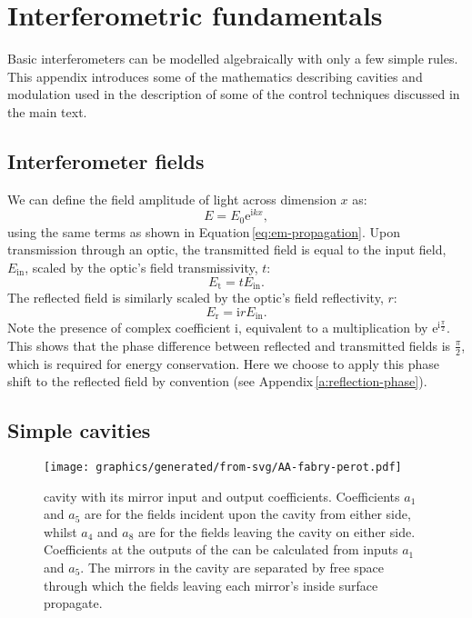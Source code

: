 \chapter{\label{a:interferometry}Interferometric fundamentals}
Basic interferometers can be modelled algebraically with only a few simple rules. This appendix introduces some of the mathematics describing \FP{} cavities and modulation used in the description of some of the control techniques discussed in the main text.

\section{Interferometer fields}
We can define the field amplitude of light across dimension $x$ as:
\begin{equation}
  \label{eq:field-amplitude}
  E = E_0 \text{e}^{\text{i} kx},
\end{equation}
using the same terms as shown in Equation\,\ref{eq:em-propagation}. Upon transmission through an optic, the transmitted field is equal to the input field, $E_{\text{in}}$, scaled by the optic's field transmissivity, $t$:
\begin{equation}
  \label{eq:transmitted-field}
  E_{\text{t}} = tE_{\text{in}}.
\end{equation}
The reflected field is similarly scaled by the optic's field reflectivity, $r$:
\begin{equation}
  \label{eq:reflected-field}
  E_{\text{r}} = \text{i}rE_{\text{in}}.
\end{equation}
Note the presence of complex coefficient $\text{i}$, equivalent to a multiplication by $\text{e}^{\text{i} \frac{\pi}{2}}$. This shows that the phase difference between reflected and transmitted fields is $\frac{\pi}{2}$, which is required for energy conservation. Here we choose to apply this phase shift to the reflected field by convention (see Appendix\,\ref{a:reflection-phase}).

\section{\label{sec:simple-cavities}Simple cavities}

\begin{figure}
  \centering
  \texttt{[image: graphics/generated/from-svg/AA-fabry-perot.pdf]}
  \caption[\FP{} cavity with its mirror input and output coefficients]{\label{fig:fabry-perot}\FP{} cavity with its mirror input and output coefficients. Coefficients $a_1$ and $a_5$ are for the fields incident upon the cavity from either side, whilst $a_4$ and $a_8$ are for the fields leaving the cavity on either side. Coefficients at the outputs of the \FP{} can be calculated from inputs $a_1$ and $a_5$. The mirrors in the cavity are separated by free space through which the fields leaving each mirror's inside surface propagate.}
\end{figure}

